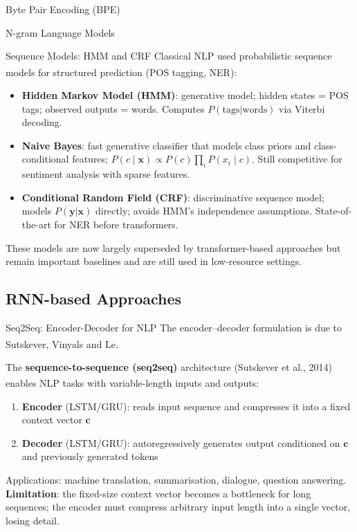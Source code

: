 \begin{v3topic}{Byte Pair Encoding (BPE)}
\begin{v3topic}{N-gram Language Models}
\end{v3topic}
\begin{v3topic}{Sequence Models: HMM and CRF}
    Classical NLP used probabilistic sequence models for structured prediction (POS tagging, NER)\textsuperscript{\cite[][p.~6]{dhamaniIntroductionGenerativeAI2024}}:
    \begin{itemize}
        \item \textbf{Hidden Markov Model (HMM)}: generative model; hidden states = POS tags; observed outputs = words.
              Computes $P(\text{tags}|\text{words})$ via Viterbi decoding.
        \item \textbf{Naive Bayes}: fast generative classifier that models class priors and class-conditional features;
              $P(c \mid \mathbf{x}) \propto P(c) \prod_i P(x_i \mid c)$.
              Still competitive for sentiment analysis with sparse features.
        \item \textbf{Conditional Random Field (CRF)}: discriminative sequence model; models $P(\mathbf{y}|\mathbf{x})$ directly; avoids HMM's independence assumptions.
              State-of-the-art for NER before transformers.
    \end{itemize}
    These models are now largely superseded by transformer-based approaches but remain important baselines and are still used in low-resource settings.
\end{v3topic}

\subsection{RNN-based Approaches}

\begin{v3topic}{Seq2Seq: Encoder-Decoder for NLP}
    The encoder--decoder formulation is due to Sutskever, Vinyals and
    Le\textsuperscript{\cite{sutskeverSequenceSequenceLearning2014}}.

    The \textbf{sequence-to-sequence (seq2seq)} architecture (Sutskever et al., 2014) enables NLP tasks with variable-length inputs and outputs\textsuperscript{\cite[][p.~8]{dhamaniIntroductionGenerativeAI2024}}:
    \begin{enumerate}
        \item \textbf{Encoder} (LSTM/GRU): reads input sequence and compresses it into a fixed context vector $\mathbf{c}$
        \item \textbf{Decoder} (LSTM/GRU): autoregressively generates output conditioned on $\mathbf{c}$ and previously generated tokens
    \end{enumerate}
    Applications: machine translation, summarisation, dialogue, question answering.
    \textbf{Limitation}: the fixed-size context vector becomes a bottleneck for long sequences; the encoder must compress arbitrary input length into a single vector, losing detail.


\end{v3topic}
\end{v3topic}
